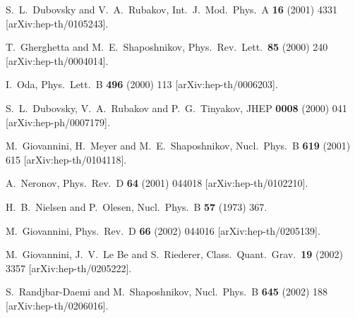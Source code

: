 \documentclass[a4paper,12pt]{article}
\begin{document}
\begin{thebibliography}{99}
S.~L.~Dubovsky and V.~A.~Rubakov,
Int.\ J.\ Mod.\ Phys.\ A {\bf 16} (2001) 4331
[arXiv:hep-th/0105243].

T.~Gherghetta and M.~E.~Shaposhnikov,
Phys.\ Rev.\ Lett.\  {\bf 85} (2000) 240
[arXiv:hep-th/0004014].

I.~Oda,
Phys.\ Lett.\ B {\bf 496} (2000) 113
[arXiv:hep-th/0006203].

S.~L.~Dubovsky, V.~A.~Rubakov and P.~G.~Tinyakov,
JHEP {\bf 0008} (2000) 041
[arXiv:hep-ph/0007179].

M.~Giovannini, H.~Meyer and M.~E.~Shaposhnikov,
Nucl.\ Phys.\ B {\bf 619} (2001) 615
[arXiv:hep-th/0104118].

A.~Neronov,
Phys.\ Rev.\ D {\bf 64} (2001) 044018
[arXiv:hep-th/0102210].

H.~B.~Nielsen and P.~Olesen,
Nucl.\ Phys.\ B {\bf 57} (1973) 367.

M.~Giovannini,
Phys.\ Rev.\ D {\bf 66} (2002) 044016
[arXiv:hep-th/0205139].

M.~Giovannini, J.~V.~Le Be and S.~Riederer,
Class.\ Quant.\ Grav.\  {\bf 19} (2002) 3357
[arXiv:hep-th/0205222].

S.~Randjbar-Daemi and M.~Shaposhnikov,
Nucl.\ Phys.\ B {\bf 645} (2002) 188
[arXiv:hep-th/0206016].


\end{thebibliography}
\end{document}
